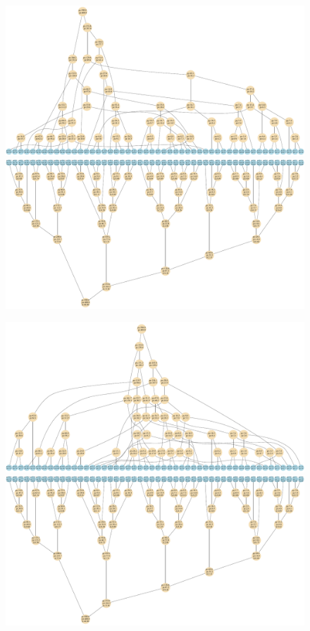 \documentclass[12pt]{article}
\begin{document}
\begin{figure}
\centering
\begin{minipage}[c]{0.49\textwidth}
 	 {
	  \includegraphics[width=\textwidth]{plots/jet70BS_orderTruth.pdf}
	   \includegraphics[width=\textwidth]{plots/jet70Truth_orderTruth.pdf}
	}
\end{minipage}
\begin{minipage}[c]{0.49\textwidth}
 	 {
	  \includegraphics[width=\textwidth]{plots/jet70Greedy_orderTruth.pdf}
	   \includegraphics[width=\textwidth]{plots/jet70Truth_orderTruth.pdf}
}
\end{minipage}
\end{figure}
\end{document}
